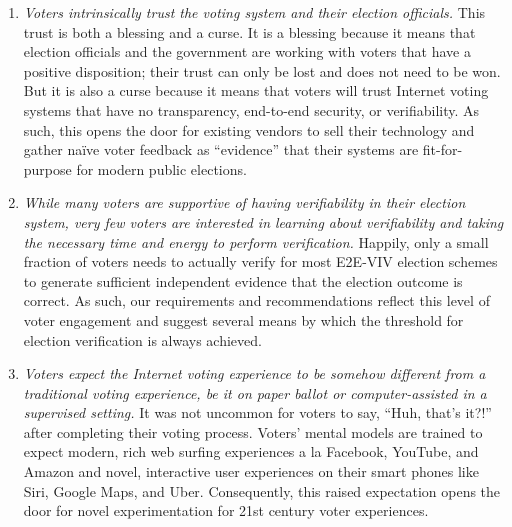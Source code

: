 \begin{enumerate}
\item \emph{Voters intrinsically trust the voting system and their
    election officials.}  This trust is both a blessing and a curse.
  It is a blessing because it means that election officials and the
  government are working with voters that have a positive disposition; 
  their trust can only be lost and does not need to be won. But it is
  also a curse because it means that voters will trust Internet voting
  systems that have no transparency, end-to-end security, or
  verifiability. As such, this opens the door for existing vendors to
  sell their technology and gather na\"ive voter feedback as
  ``evidence'' that their systems are fit-for-purpose for modern
  public elections.
\item \emph{While many voters are supportive of having verifiability
    in their election system, very few voters are interested in
    learning about verifiability and taking the necessary time and
    energy to perform verification.} Happily, only a small fraction
  of voters needs to actually verify for most E2E-VIV election schemes
  to generate sufficient independent evidence that the election outcome
  is correct. As such, our requirements and recommendations reflect
  this level of voter engagement and suggest several means by which
  the threshold for election verification is always achieved.
\item \emph{Voters expect the Internet voting experience to be somehow
    different from a traditional voting experience, be it on paper
    ballot or computer-assisted in a supervised setting.} It was not
  uncommon for voters to say, ``Huh, that's it?!'' after completing
  their voting process. Voters' mental models are trained to expect
  modern, rich web surfing experiences a la Facebook, YouTube, and
  Amazon and novel, interactive user experiences on their smart phones
  like Siri, Google Maps, and Uber. Consequently, this raised
  expectation opens the door for novel experimentation for 21st
  century voter experiences.
\end{enumerate}

